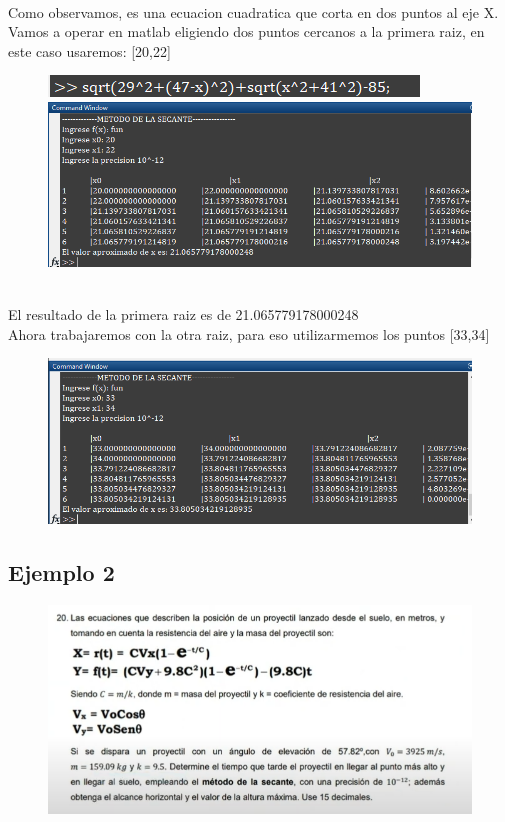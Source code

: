 \documentclass{article}
\theoremstyle{mytheoremstyle}
\theoremstyle{mytheoremstyle}
\theoremstyle{myproblemstyle}
\begin{document}
\noindent \\ Como observamos, es una ecuacion cuadratica que corta en dos puntos al eje X.
\\Vamos a operar en matlab eligiendo dos puntos cercanos a la primera raiz, en este caso usaremos: [20,22]
\begin{figure}[ht]
    \includegraphics*[scale=0.7]{img/secante02.png}
    \\ \includegraphics*[scale=0.8]{img/secante03.png}
\end{figure}
\noindent \\El resultado de la primera raiz es de 21.065779178000248
\\Ahora trabajaremos con  la otra raiz, para eso utilizarmemos los puntos [33,34]
\begin{figure}[ht]
    \includegraphics*[scale=0.7]{img/secante04.png}
\end{figure}

\pagebreak
\subsection*{Ejemplo 2}
\begin{figure}[ht]
    \includegraphics*[scale=0.9]{img/ej20_secante.png}
\end{figure}
\end{document}
